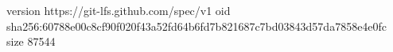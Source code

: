 version https://git-lfs.github.com/spec/v1
oid sha256:60788e00c8cf90f020f43a52fd64b6fd7b821687c7bd03843d57da7858e4e0fc
size 87544
